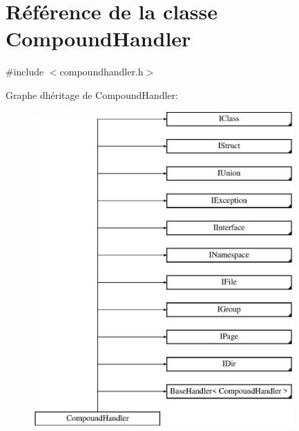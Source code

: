 \hypertarget{class_compound_handler}{}\section{Référence de la classe Compound\+Handler}
\label{class_compound_handler}


{\ttfamily \#include $<$compoundhandler.\+h$>$}

Graphe d\textquotesingle{}héritage de Compound\+Handler\+:\begin{figure}[H]
\begin{center}
\leavevmode
\includegraphics[height=12.000000cm]{class_compound_handler}
\end{center}
\end{figure}
